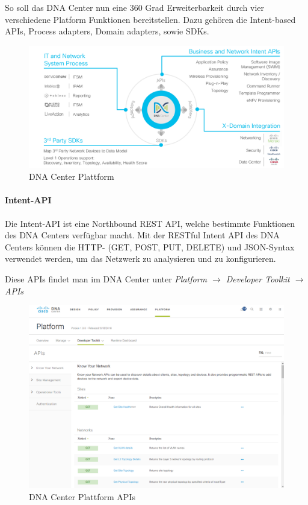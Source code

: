 So soll das DNA Center nun eine 360 Grad Erweiterbarkeit durch vier verschiedene Platform Funktionen bereitstellen. Dazu gehören die Intent-based APIs, Process adapters, Domain adapters, sowie SDKs. \cite{dnac-platform}

\begin{figure}[H]
	\centering
	\includegraphics[width=0.8\linewidth]{img/Abstrahierung/dnac-platform}
	\caption{DNA Center Plattform \cite{dnac-platform}}
	\label{fig:DNA Center Plattform}
\end{figure}


\paragraph{Intent-API}

Die Intent-API ist eine Northbound REST API, welche bestimmte Funktionen des DNA Centers verfügbar macht. Mit der RESTful Intent API des DNA Centers können die HTTP- (GET, POST, PUT, DELETE) und JSON-Syntax verwendet werden, um das Netzwerk zu analysieren und zu konfigurieren. \cite{dnac-platform}

Diese APIs findet man im DNA Center unter \textit{Platform $\rightarrow$ Developer Toolkit $\rightarrow$ APIs}

\begin{figure}[H]
	\centering
	\includegraphics[width=0.8\linewidth]{img/Abstrahierung/dnac-apis}
	\caption{DNA Center Plattform APIs}
	\label{fig:DNA Center Plattform APIs}
\end{figure}

